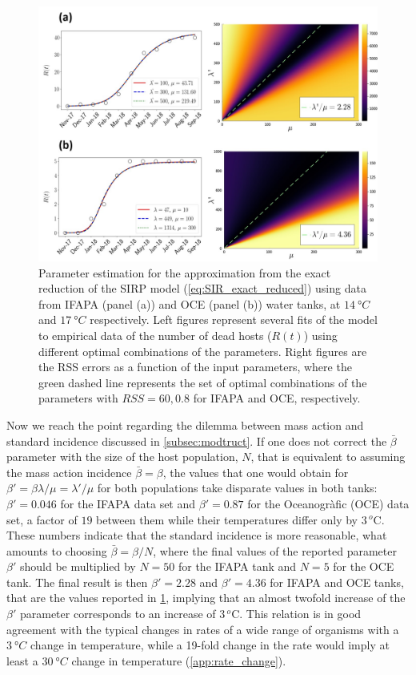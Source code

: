 \begin{figure}[H]
    \centering
    \includegraphics[width=1\textwidth]{Figures/exact_SIR_fitting.jpg}
    \caption{Parameter estimation for the approximation from the exact
        reduction of the SIRP model (\cref{eq:SIR_exact_reduced}) using data
        from IFAPA
        (panel (a)) and OCE (panel (b)) water tanks, at $\SI{14}{\degree C}$
        and
        $\SI{17}{\degree C}$ respectively. Left figures represent several fits
        of the
        model to empirical data of the number of dead hosts ($R(t)$) using
        different
        optimal combinations of the parameters. Right figures are the RSS
        errors as a
        function of the input parameters, where the green dashed line
        represents the
        set of optimal combinations of the parameters with $RSS=60, 0.8$ for
        IFAPA and
        OCE, respectively.}
    \label{fig: exact_SIR_fit}
\end{figure}

Now we reach the point regarding the dilemma between mass action and
standard incidence discussed in \cref{subsec:modtruct}. If one does not correct
the $\bar{\beta}$ parameter with the size of the host population, $N$, that is
equivalent to assuming the mass action incidence $\bar{\beta}=\beta$, the
values that one would obtain for $\beta'=\beta\lambda/\mu=\lambda'/\mu$ for
both populations take disparate values in both tanks: $\beta'=0.046$ for the
IFAPA data set and $\beta'=0.87$ for the Oceanogràfic (OCE) data set, a factor
of $19$ between them while their temperatures differ only by $3\,{}^o$C.
These numbers indicate that the standard incidence is more reasonable, what
amounts to choosing $\bar{\beta}=\beta/N$, where the final values of the
reported parameter $\beta'$ should be multiplied by $N=50$ for the IFAPA tank
and $N=5$ for the OCE tank. The final result is then $\beta'=2.28$ and
$\beta'=4.36$ for IFAPA and OCE tanks, that are the values reported in
\cref{fig: exact_SIR_fit}, implying that an almost twofold increase of the
$\beta'$ parameter corresponds to an increase of $3\,{}^o$C. This relation is
in good agreement with the typical changes in rates of a wide range of
organisms with a $\SI{3}{\degree C}$ change in temperature, while a 19-fold
change in the rate would imply at least a $\SI{30}{\degree C}$ change in
temperature (\cref{app:rate_change}).

